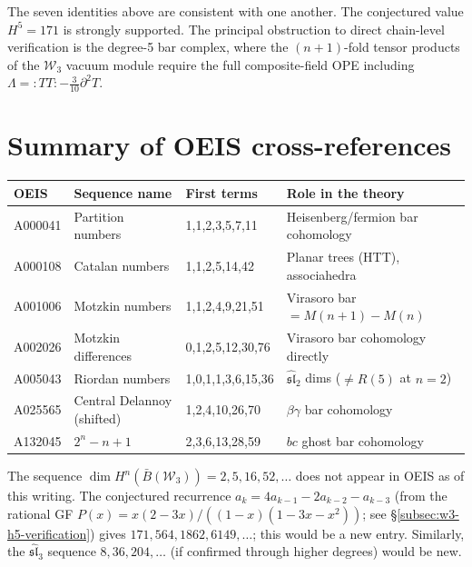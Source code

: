 \noindent
The seven identities above are consistent with one another.
The conjectured value $H^5 = 171$ is strongly supported.
The principal obstruction to direct chain-level verification is the
degree-5 bar complex, where the $(n+1)$-fold tensor products of the
$\mathcal{W}_3$ vacuum module require the full composite-field OPE
including $\Lambda = {:}TT{:} - \tfrac{3}{10}\partial^2 T$.

\section{Summary of OEIS cross-references}
\label{sec:oeis}

\begin{center}
\renewcommand{\arraystretch}{1.4}
\begin{tabular}{lllp{5.5cm}}
\toprule
\textbf{OEIS} & \textbf{Sequence name} & \textbf{First terms} & \textbf{Role in the theory} \\
\midrule
A000041 & Partition numbers & 1,1,2,3,5,7,11 & Heisenberg/fermion bar cohomology \\
A000108 & Catalan numbers & 1,1,2,5,14,42 & Planar trees (HTT), associahedra \\
A001006 & Motzkin numbers & 1,1,2,4,9,21,51 & Virasoro bar $= M(n{+}1) - M(n)$ \\
A002026 & Motzkin differences & 0,1,2,5,12,30,76 & Virasoro bar cohomology directly \\
A005043 & Riordan numbers & 1,0,1,1,3,6,15,36 & $\widehat{\mathfrak{sl}}_2$ dims ($\neq R(5)$ at $n{=}2$) \\
A025565 & Central Delannoy (shifted) & 1,2,4,10,26,70 & $\beta\gamma$ bar cohomology \\
A132045 & $2^n - n + 1$ & 2,3,6,13,28,59 & $bc$ ghost bar cohomology \\
\bottomrule
\end{tabular}
\end{center}

\medskip

\noindent
The sequence $\dim H^n(\bar{B}(\mathcal{W}_3)) = 2, 5, 16, 52, \ldots$ does not appear in OEIS as of this writing.  The conjectured recurrence $a_k = 4a_{k-1} - 2a_{k-2} - a_{k-3}$ (from the rational GF $P(x) = x(2-3x)/((1-x)(1-3x-x^2))$; see \S\ref{subsec:w3-h5-verification}) gives $171, 564, 1862, 6149, \ldots$; this would be a new entry.  Similarly, the $\widehat{\mathfrak{sl}}_3$ sequence $8, 36, 204, \ldots$ (if confirmed through higher degrees) would be new.

